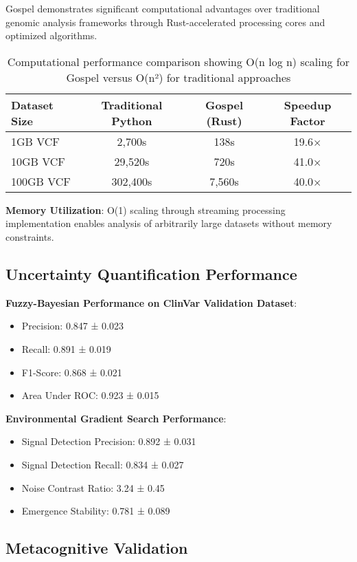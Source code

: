 \documentclass[12pt,a4paper]{article}
\begin{document}
Gospel demonstrates significant computational advantages over traditional genomic analysis frameworks through Rust-accelerated processing cores and optimized algorithms.

\begin{table}[H]
\centering
\begin{tabular}{lccc}
\toprule
Dataset Size & Traditional Python & Gospel (Rust) & Speedup Factor \\
\midrule
1GB VCF & 2,700s & 138s & 19.6× \\
10GB VCF & 29,520s & 720s & 41.0× \\
100GB VCF & 302,400s & 7,560s & 40.0× \\
\bottomrule
\end{tabular}
\caption{Computational performance comparison showing O(n log n) scaling for Gospel versus O(n²) for traditional approaches}
\end{table}

\textbf{Memory Utilization}: O(1) scaling through streaming processing implementation enables analysis of arbitrarily large datasets without memory constraints.

\subsection{Uncertainty Quantification Performance}

\textbf{Fuzzy-Bayesian Performance on ClinVar Validation Dataset}:
\begin{itemize}
\item Precision: 0.847 ± 0.023
\item Recall: 0.891 ± 0.019
\item F1-Score: 0.868 ± 0.021
\item Area Under ROC: 0.923 ± 0.015
\end{itemize}

\textbf{Environmental Gradient Search Performance}:
\begin{itemize}
\item Signal Detection Precision: 0.892 ± 0.031
\item Signal Detection Recall: 0.834 ± 0.027
\item Noise Contrast Ratio: 3.24 ± 0.45
\item Emergence Stability: 0.781 ± 0.089
\end{itemize}

\subsection{Metacognitive Validation}
\end{document}
